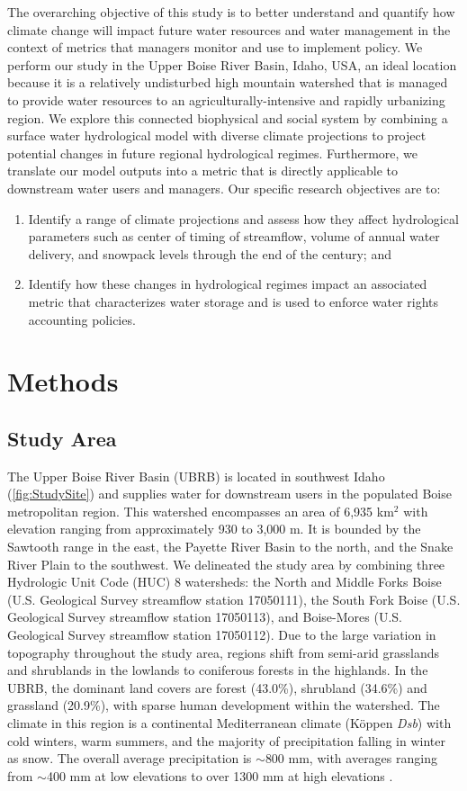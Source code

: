 \documentclass[11pt,letterpaper]{article}
\begin{document}
The overarching objective of this study is to better understand and quantify how climate change will impact future water resources and water management in the context of metrics that managers monitor and use to implement policy. We perform our study in the Upper Boise River Basin, Idaho, USA, an ideal location because it is a relatively undisturbed high mountain watershed that is managed to provide water resources to an agriculturally-intensive and rapidly urbanizing region. We explore this connected biophysical and social system by combining a surface water hydrological model with diverse climate projections to project potential changes in future regional hydrological regimes. Furthermore, we translate our model outputs into a metric that is directly applicable to downstream water users and managers. Our specific research objectives are to:

\begin{enumerate}
\item Identify a range of climate projections and assess how they affect hydrological parameters such as center of timing of streamflow, volume of annual water delivery, and snowpack levels through the end of the century; and
\item Identify how these changes in hydrological regimes impact an associated metric that characterizes water storage and is used to enforce water rights accounting policies.
\end{enumerate}

\section{Methods}
\subsection{Study Area}
The Upper Boise River Basin (UBRB) is located in southwest Idaho (\cref{fig:StudySite}) and supplies water for downstream users in the populated Boise metropolitan region. This watershed encompasses an area of 6,935 km${}^2$ with elevation ranging from approximately 930 to 3,000 m. It is bounded by the Sawtooth range in the east, the Payette River Basin to the north, and the Snake River Plain to the southwest. We delineated the study area by combining three Hydrologic Unit Code (HUC) 8 watersheds: the North and Middle Forks Boise (U.S. Geological Survey streamflow station 17050111), the South Fork Boise (U.S. Geological Survey streamflow station 17050113), and Boise-Mores (U.S. Geological Survey streamflow station 17050112). Due to the large variation in topography throughout the study area, regions shift from semi-arid grasslands and shrublands in the lowlands to coniferous forests in the highlands. In the UBRB, the dominant land covers are forest (43.0\%), shrubland (34.6\%) and grassland (20.9\%), with sparse human development within the watershed. The climate in this region is a continental Mediterranean climate (K\"{o}ppen \textit{Dsb}) with cold winters, warm summers, and the majority of precipitation falling in winter as snow. The overall average precipitation is $\sim$800 mm, with averages ranging from $\sim$400 mm at low elevations to over 1300 mm at high elevations \citep{Daly:2008hsa}.
\end{document}
